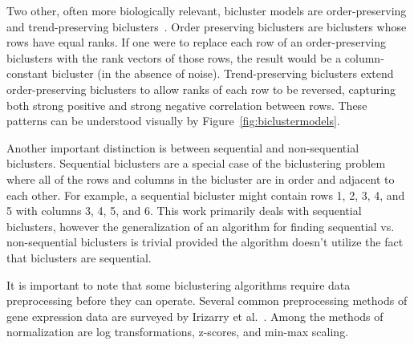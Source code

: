 
Two other, often more biologically relevant, bicluster models are order-preserving and trend-preserving biclusters~\cite{wang2016unibic}.
Order preserving biclusters are biclusters whose rows have equal ranks.
If one were to replace each row of an order-preserving biclusters with the rank vectors of those rows, the result would be a column-constant bicluster (in the absence of noise).
Trend-preserving biclusters extend order-preserving biclusters to allow ranks of each row to be reversed, capturing both strong positive and strong negative correlation between rows.
These patterns can be understood visually by Figure~\ref{fig:biclustermodels}.



Another important distinction is between sequential and non-sequential biclusters. Sequential biclusters are a special case of the biclustering problem where all of the rows and columns in the bicluster are in order and adjacent to each other. For example, a sequential bicluster might contain rows 1, 2, 3, 4, and 5 with columns 3, 4, 5, and 6. This work primarily deals with sequential biclusters, however the generalization of an algorithm for finding sequential vs. non-sequential biclusters is trivial provided the algorithm doesn't utilize the fact that biclusters are sequential.

It is important to note that some biclustering algorithms require data preprocessing before they can operate.
Several common preprocessing methods of gene expression data are surveyed by Irizarry et al.~\cite{irizarry2003exploration}.
Among the methods of normalization are log transformations, z-scores, and min-max scaling.

